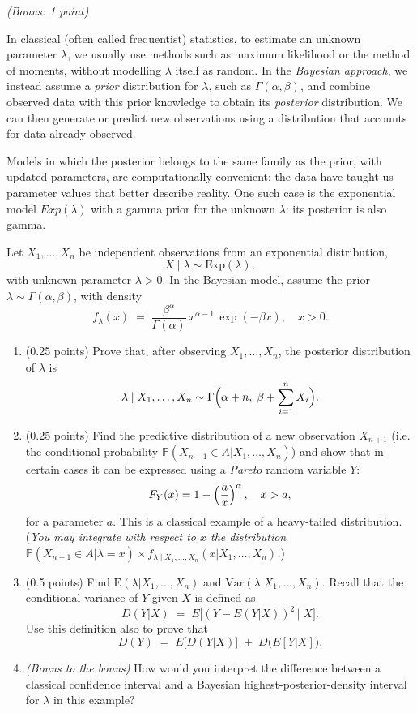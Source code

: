 \documentclass[a4paper]{report}
\begin{document}
\begin{problem}
\textit{(Bonus: 1 point)}

In classical (often called frequentist) statistics, to estimate an unknown parameter \(\lambda\),
we usually use methods such as maximum likelihood or the method of moments,
without modelling \(\lambda\) itself as random.
In the \emph{Bayesian approach}, we instead assume a \emph{prior}
distribution for \(\lambda\), such as \(\Gamma(\alpha,\beta)\), and combine observed data with this prior knowledge
to obtain its \emph{posterior} distribution.
We can then generate or predict new observations using a distribution that accounts for data already observed.

\bigskip
Models in which the posterior belongs to the same family as the prior, with updated parameters, are computationally convenient: the data
have taught us parameter values that better describe reality. One such case is the exponential model
$Exp(\lambda)$ with a gamma prior for the unknown $\lambda$: its posterior is also gamma.

Let \(X_1,\dots,X_n\) be independent observations from an exponential distribution,
\[
X\mid\lambda \sim \mathrm{Exp}(\lambda),
\]
with unknown parameter \(\lambda>0\). In the Bayesian model, assume the prior \(\lambda\sim\Gamma(\alpha,\beta)\), with density
\[
f_\lambda(x) \;=\; \frac{\beta^\alpha}{\Gamma(\alpha)}\,x^{\alpha-1}\,\exp(-\beta x),
\quad x>0.
\]

\begin{enumerate}
    \item (0.25 points) Prove that, after observing \(X_1,\dots,X_n\), the posterior distribution of \(\lambda\) is
    \[\lambda\mid X_1,\ldots,X_n\sim\mathrm{\Gamma}\Bigl(\alpha + n,\;\beta + \sum_{i=1}^n X_i\Bigr).\]

    \item (0.25 points) Find the predictive distribution of a new observation \(X_{n+1}\)
    (i.e. the conditional probability \(\mathbb P(X_{n+1}\in A|X_1,\dots,X_n)\))
    and show that in certain cases it can be expressed using a \textit{Pareto} random variable $Y$:
    \[
    F_Y(x) = 1 - \left ( \frac{a}{x} \right )^\alpha,
    \quad
    x > a,
    \]
    for a parameter $a$. This is
    a classical example of a heavy-tailed distribution.
    (\textit{You may integrate with respect to \(x\) the distribution
    \(\mathbb{P}(X_{n+1}\in A|\lambda=x)\times f_{\lambda\mid X_1,\dots,X_n}(x|X_1,\ldots,X_n)\).})

    \item (0.5 points)
    Find \(\mathrm E(\lambda|X_1,\dots,X_n)\) and \(\mathrm{Var}(\lambda|X_1,\dots,X_n)\).
    Recall that the conditional variance of \(Y\) given \(X\) is defined as
    \[
       D(Y|X) \;=\; E\bigl[(Y - E(Y|X))^2 \,\big|\;X\bigr].
    \]
    Use this definition also to prove that
    \[
       D(Y) \;=\; E\bigl[D(Y|X)\bigr]\;+\; D\bigl(E[Y|X]\bigr).
    \]

    \item \textit{(Bonus to the bonus)}
    How would you interpret the difference between a classical confidence interval and
    a Bayesian highest-posterior-density interval for \(\lambda\) in this example?
\end{enumerate}
\end{problem}
\end{document}
